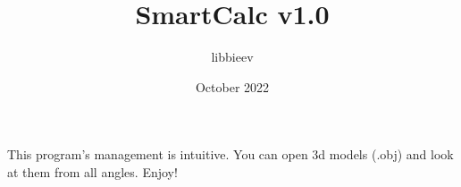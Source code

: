 \documentclass{article}
\title{SmartCalc v1.0}
\author{libbieev}
\date{October 2022}
\begin{document}
\maketitle

This program's management is intuitive. You can open 3d models (.obj) and look at them from all angles. Enjoy!
\end{document}
